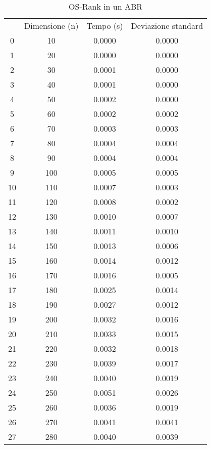 \begin{table}
\centering
\caption{OS-Rank in un ABR}
\label{OS-Rank in un ABR}
\begin{adjustbox}{width=1\textwidth/2}
\begin{tabular}{|c|c|c|c|}
\hline
 & Dimensione (n) & Tempo (s) & Deviazione standard \\
0 & 10 & 0.0000 & 0.0000 \\
\cline{1-4}
1 & 20 & 0.0000 & 0.0000 \\
\cline{1-4}
2 & 30 & 0.0001 & 0.0000 \\
\cline{1-4}
3 & 40 & 0.0001 & 0.0000 \\
\cline{1-4}
4 & 50 & 0.0002 & 0.0000 \\
\cline{1-4}
5 & 60 & 0.0002 & 0.0002 \\
\cline{1-4}
6 & 70 & 0.0003 & 0.0003 \\
\cline{1-4}
7 & 80 & 0.0004 & 0.0004 \\
\cline{1-4}
8 & 90 & 0.0004 & 0.0004 \\
\cline{1-4}
9 & 100 & 0.0005 & 0.0005 \\
\cline{1-4}
10 & 110 & 0.0007 & 0.0003 \\
\cline{1-4}
11 & 120 & 0.0008 & 0.0002 \\
\cline{1-4}
12 & 130 & 0.0010 & 0.0007 \\
\cline{1-4}
13 & 140 & 0.0011 & 0.0010 \\
\cline{1-4}
14 & 150 & 0.0013 & 0.0006 \\
\cline{1-4}
15 & 160 & 0.0014 & 0.0012 \\
\cline{1-4}
16 & 170 & 0.0016 & 0.0005 \\
\cline{1-4}
17 & 180 & 0.0025 & 0.0014 \\
\cline{1-4}
18 & 190 & 0.0027 & 0.0012 \\
\cline{1-4}
19 & 200 & 0.0032 & 0.0016 \\
\cline{1-4}
20 & 210 & 0.0033 & 0.0015 \\
\cline{1-4}
21 & 220 & 0.0032 & 0.0018 \\
\cline{1-4}
22 & 230 & 0.0039 & 0.0017 \\
\cline{1-4}
23 & 240 & 0.0040 & 0.0019 \\
\cline{1-4}
24 & 250 & 0.0051 & 0.0026 \\
\cline{1-4}
25 & 260 & 0.0036 & 0.0019 \\
\cline{1-4}
26 & 270 & 0.0041 & 0.0041 \\
\cline{1-4}
27 & 280 & 0.0040 & 0.0039 \\

\end{tabular}
\end{adjustbox}
\end{table}
